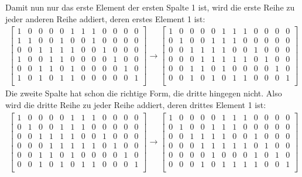 \documentclass[a4paper,10pt,ngerman]{scrartcl}
\begin{document}
Damit nun nur das erste Element der ersten Spalte 1 ist, wird die erste Reihe zu jeder anderen Reihe addiert, deren erstes Element 1 ist:
\begin{align*}
\left[ \begin{array}{cccccc|cccccc}
1 & 0 & 0 & 0 & 0 & 1 & 1 & 1 & 0 & 0 & 0 & 0 \\
1 & 1 & 0 & 0 & 1 & 0 & 0 & 1 & 0 & 0 & 0 & 0 \\
0 & 0 & 1 & 1 & 1 & 1 & 0 & 0 & 1 & 0 & 0 & 0 \\
1 & 0 & 0 & 1 & 1 & 0 & 0 & 0 & 0 & 1 & 0 & 0 \\
0 & 0 & 1 & 1 & 0 & 1 & 0 & 0 & 0 & 0 & 1 & 0 \\
1 & 0 & 1 & 0 & 1 & 1 & 0 & 0 & 0 & 0 & 0 & 1 \\
\end{array} \right]
\rightarrow \left[ \begin{array}{cccccc|cccccc}
1 & 0 & 0 & 0 & 0 & 1 & 1 & 1 & 0 & 0 & 0 & 0 \\
0 & 1 & 0 & 0 & 1 & 1 & 1 & 0 & 0 & 0 & 0 & 0 \\
0 & 0 & 1 & 1 & 1 & 1 & 0 & 0 & 1 & 0 & 0 & 0 \\
0 & 0 & 0 & 1 & 1 & 1 & 1 & 1 & 0 & 1 & 0 & 0 \\
0 & 0 & 1 & 1 & 0 & 1 & 0 & 0 & 0 & 0 & 1 & 0 \\
0 & 0 & 1 & 0 & 1 & 0 & 1 & 1 & 0 & 0 & 0 & 1 \\
\end{array} \right]
\end{align*}
Die zweite Spalte hat schon die richtige Form, die dritte hingegen nicht. Also wird die dritte Reihe zu jeder Reihe addiert, deren drittes Element 1 ist:
\begin{align*}
\left[ \begin{array}{cccccc|cccccc}
1 & 0 & 0 & 0 & 0 & 1 & 1 & 1 & 0 & 0 & 0 & 0 \\
0 & 1 & 0 & 0 & 1 & 1 & 1 & 0 & 0 & 0 & 0 & 0 \\
0 & 0 & 1 & 1 & 1 & 1 & 0 & 0 & 1 & 0 & 0 & 0 \\
0 & 0 & 0 & 1 & 1 & 1 & 1 & 1 & 0 & 1 & 0 & 0 \\
0 & 0 & 1 & 1 & 0 & 1 & 0 & 0 & 0 & 0 & 1 & 0 \\
0 & 0 & 1 & 0 & 1 & 0 & 1 & 1 & 0 & 0 & 0 & 1 \\
\end{array} \right]
\rightarrow \left[ \begin{array}{cccccc|cccccc}
1 & 0 & 0 & 0 & 0 & 1 & 1 & 1 & 0 & 0 & 0 & 0 \\
0 & 1 & 0 & 0 & 1 & 1 & 1 & 0 & 0 & 0 & 0 & 0 \\
0 & 0 & 1 & 1 & 1 & 1 & 0 & 0 & 1 & 0 & 0 & 0 \\
0 & 0 & 0 & 1 & 1 & 1 & 1 & 1 & 0 & 1 & 0 & 0 \\
0 & 0 & 0 & 0 & 1 & 0 & 0 & 0 & 1 & 0 & 1 & 0 \\
0 & 0 & 0 & 1 & 0 & 1 & 1 & 1 & 1 & 0 & 0 & 1 \\
\end{array} \right]
\end{align*}
\end{document}
